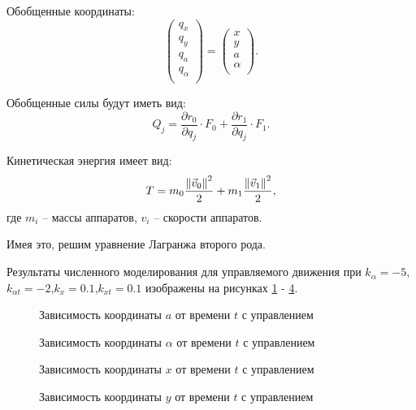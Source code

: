 Обобщенные координаты:
\begin{equation*}
\label{eq:2sph_qj}
	\begin{pmatrix}
		q_x \\
		q_y \\
		q_a \\
		q_\alpha \\
	\end{pmatrix} 
	=
	\begin{pmatrix}
		x \\
		y \\
		a \\
		\alpha \\
	\end{pmatrix}.
\end{equation*}

Обобщенные силы будут иметь вид:
\begin{equation*}
\label{eq:2sph_Q}
	Q_j = \frac{\partial r_0}{\partial q_j} \cdot F_0 + \frac{\partial r_1}{\partial q_j} \cdot F_1.
\end{equation*}

Кинетическая энергия имеет вид:
\begin{equation*}
\label{eq:2sph_T}
	T = m_0 \frac{\left\lVert\vec{v}_0\right\rVert^2}{2} + m_1 \frac{\left\lVert\vec{v}_1\right\rVert^2}{2},
\end{equation*}
где $m_i$ – массы аппаратов, $v_i$ – скорости аппаратов.

Имея это, решим уравнение Лагранжа второго рода.

Результаты численного моделирования для управляемого движения при $k_\alpha = -5$,$k_{\alpha t} = -2$,$k_x = 0.1$,$k_{x t} = 0.1$ изображены на рисунках \ref{ris:2sph_a_full_u} - \ref{ris:2sph_y_full_u}.

\begin{figure}[H]
	\caption{Зависимость координаты $a$ от времени $t$ с управлением}
	\label{ris:2sph_a_full_u}
\end{figure}
\begin{figure}[H]
	\caption{Зависимость координаты $\alpha$ от времени $t$ с управлением}
	\label{ris:2sph_alpha_full_u}
\end{figure} 
\begin{figure}[H]
	\caption{Зависимость координаты $x$ от времени $t$ с управлением}
	\label{ris:2sph_x_full_u}
\end{figure} 
\begin{figure}[H]
	\caption{Зависимость координаты $y$ от времени $t$ с управлением}
	\label{ris:2sph_y_full_u}
\end{figure} 

